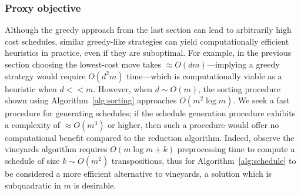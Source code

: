 \documentclass{siamart190516}
\begin{document}
\subsubsection{Proxy objective}\label{sec:proxy_objective}
Although the greedy approach from the last section can lead to arbitrarily high cost schedules, similar greedy-like strategies can yield computationally efficient heuristics in practice, even if they are suboptimal. 
For example, in the previous section choosing the lowest-cost move takes $\approx O(dm)$---implying a greedy strategy would require $O(d^2 m)$ time---which is computationally viable as a heuristic when $d << m$. 
However, when $d \sim O(m)$, the sorting procedure shown using Algorithm~\ref{alg:sorting} approaches $O(m^2 \log m)$. We seek a fast procedure for generating schedules; if the schedule generation procedure exhibits a complexity of $\approx O(m^3)$ or higher, then such a procedure would offer no computational benefit compared to the reduction algorithm. 
Indeed, observe the vineyards algorithm requires $O(m \log m + k)$ preprocessing time to compute a schedule of size $k \sim O(m^2)$ transpositions, thus for Algorithm~\ref{alg:schedule} to be considered a more efficient alternative to vineyards, a solution which is subquadratic in $m$ is desirable. 
\end{document}
